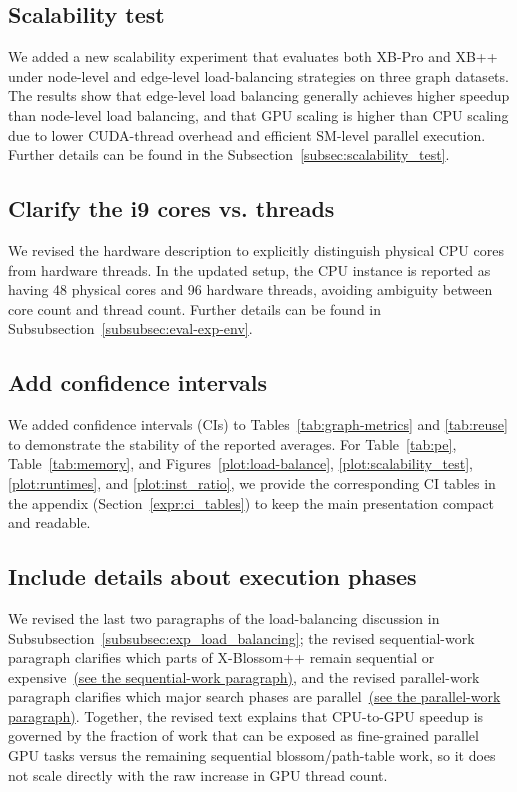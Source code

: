 \subsection{Scalability test}
\label{subsec:rev-scalability}
We added a new scalability experiment that evaluates both XB-Pro and XB++ under node-level and edge-level load-balancing strategies on three graph datasets. 
The results show that edge-level load balancing generally achieves higher speedup than node-level load balancing, and that GPU scaling is higher than CPU scaling due to lower CUDA-thread overhead and efficient SM-level parallel execution.
Further details can be found in the Subsection~\ref{subsec:scalability_test}.

\subsection{Clarify the i9 cores vs. threads}
\label{subsec:rev-cores-threads}
We revised the hardware description to explicitly distinguish physical CPU cores from hardware threads. In the updated setup, the CPU instance is reported as having 48 physical cores and 96 hardware threads, avoiding ambiguity between core count and thread count. Further details can be found in Subsubsection~\ref{subsubsec:eval-exp-env}.

\subsection{Add confidence intervals}
\label{subsec:rev-confidence-intervals}
We added confidence intervals (CIs) to Tables~\ref{tab:graph-metrics} and \ref{tab:reuse} to demonstrate the stability of the reported averages.
For Table~\ref{tab:pe}, Table~\ref{tab:memory}, and Figures~\ref{plot:load-balance}, \ref{plot:scalability_test}, \ref{plot:runtimes}, and \ref{plot:inst_ratio}, we provide the corresponding CI tables in the appendix (Section~\ref{expr:ci_tables}) to keep the main presentation compact and readable.

\subsection{Include details about execution phases}
\label{subsec:rev-execution-phases}
We revised the last two paragraphs of the load-balancing discussion in Subsubsection~\ref{subsubsec:exp_load_balancing}; the revised sequential-work paragraph clarifies which parts of X-Blossom++ remain sequential or expensive~\hyperref[para:xbpp-sequential-work]{(see the sequential-work paragraph)}, and the revised parallel-work paragraph clarifies which major search phases are parallel~\hyperref[para:xbpp-parallel-work]{(see the parallel-work paragraph)}. Together, the revised text explains that CPU-to-GPU speedup is governed by the fraction of work that can be exposed as fine-grained parallel GPU tasks versus the remaining sequential blossom/path-table work, so it does not scale directly with the raw increase in GPU thread count.

